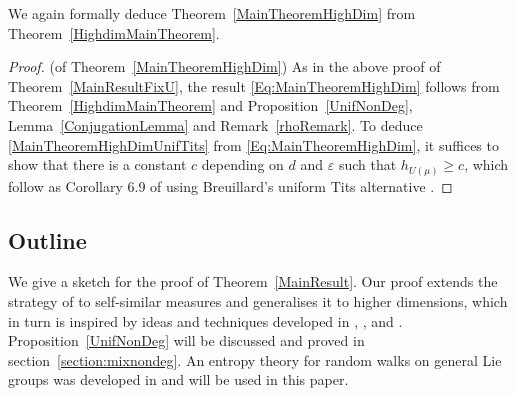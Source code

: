 \documentclass[10pt, english,oneside,reqno]{amsart}
\theoremstyle{plain}
\theoremstyle{remark}
\numberwithin{equation}{section}
\numberwithin{figure}{section}
\newcommand{\eps}{\varepsilon}
\begin{document}
    We again formally deduce Theorem~\ref{MainTheoremHighDim} from Theorem~\ref{HighdimMainTheorem}.

    \begin{proof}(of Theorem~\ref{MainTheoremHighDim})
        As in the above proof of Theorem~\ref{MainResultFixU}, the result \eqref{Eq:MainTheoremHighDim} follows from Theorem~\ref{HighdimMainTheorem} and Proposition~\ref{UnifNonDeg}, Lemma~\ref{ConjugationLemma} and Remark~\ref{rhoRemark}. To deduce \eqref{MainTheoremHighDimUnifTits} from \eqref{Eq:MainTheoremHighDim}, it suffices to show that there is a constant $c$ depending on $d$ and $\eps$ such that $h_{U(\mu)} \geq c$, which follow as Corollary 6.9 of \cite{HochmanSolomyak2017} using Breuillard's uniform Tits alternative \cite{Breuillard2008}.
    \end{proof}

    


\subsection{Outline} \label{section:Outline}

We give a sketch for the proof of Theorem~\ref{MainResult}. Our proof extends the strategy of \cite{Kittle2023} to self-similar measures and generalises it to higher dimensions, which in turn is inspired by ideas and techniques developed in \cite{Hochman2014}, \cite{Hochman2017}, \cite{Varju2019} and \cite{Kittle2021}. Proposition~\ref{UnifNonDeg} will be discussed and proved in section~\ref{section:mixnondeg}. An entropy theory for random walks on general Lie groups was developed in \cite{KittleKoglerEntropy} and will be used in this paper.
\end{document}
